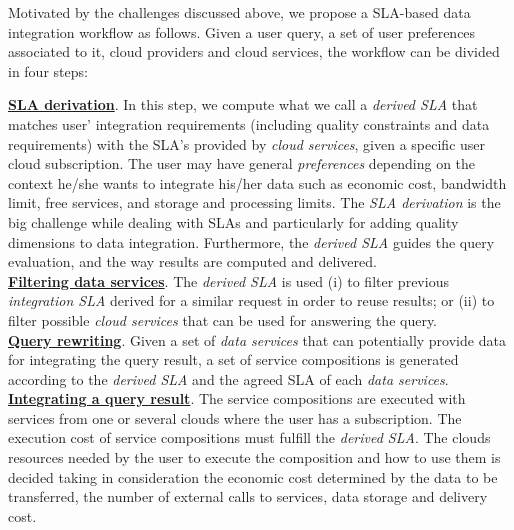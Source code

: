 Motivated by the challenges discussed above, we propose a SLA-based data integration workflow as follows. Given a user query, a set of user preferences associated to it, cloud providers and cloud services, the workflow can be divided in four steps:
%

\noindent \textbf{\underline{SLA derivation}}. In this step, we compute what we call a \textsl{derived SLA} that matches user' integration requirements (including quality constraints and data requirements) with the SLA's provided by \textit{cloud services}, given a specific user cloud subscription. The user may have general \textit{preferences} depending on the context he/she wants to integrate his/her data such as economic cost, bandwidth limit, free services, and storage and processing limits. The \textit{SLA derivation} is the big challenge while dealing with SLAs and particularly for adding quality dimensions to data integration. Furthermore, the \textsl{derived SLA} guides the query evaluation, and the way results are computed and delivered. \\
\textbf{\underline{Filtering data services}}. The \textsl{derived SLA} is used (i)
to filter previous \textsl{integration SLA} derived for a similar request in order to reuse results; or (ii) to filter possible \textit{cloud services} that can be used for answering the query. \\ %
\textbf{\underline{Query rewriting}}. Given a set of \textit{data services} that can
potentially provide data for integrating the query result, a set of service compositions is generated according to the \textsl{derived SLA} and the agreed SLA of each \textit{data services}. \\
\textbf{\underline{Integrating a query result}}. The service compositions are
executed with services from one or several clouds where the user has a
subscription.
The execution cost of service compositions must fulfill the \textsl{derived
SLA}. The clouds resources needed by the user to execute the composition and how
to use them is decided taking in consideration the economic cost determined by
the data to be transferred, the number of external calls to services, data storage and delivery cost.

